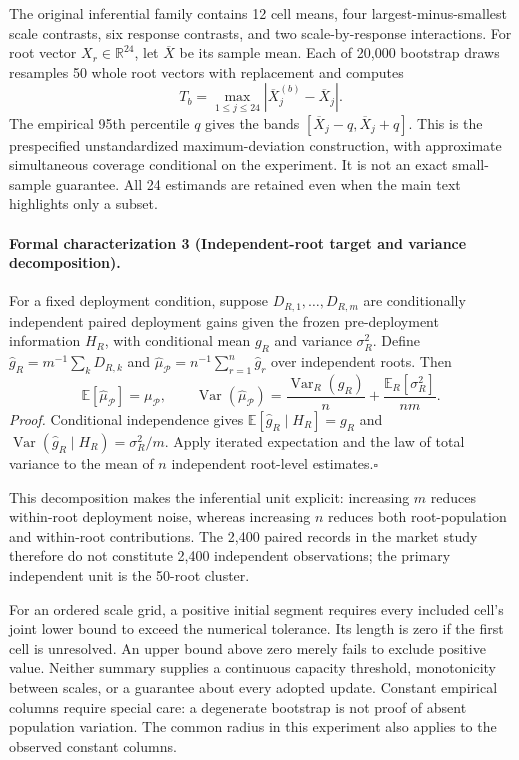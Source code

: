 \documentclass[10pt,letterpaper]{article}
\newcommand{\E}{\mathbb{E}}
\begin{document}
The original inferential family contains 12 cell means, four largest-minus-smallest scale contrasts, six response contrasts, and two scale-by-response interactions. For root vector $X_r\in\mathbb R^{24}$, let $\overline X$ be its sample mean. Each of 20,000 bootstrap draws resamples 50 whole root vectors with replacement and computes
\begin{equation}
T_b=\max_{1\leq j\leq24}|\overline X^{(b)}_j-\overline X_j|.
\end{equation}
The empirical 95th percentile $q$ gives the bands $[\overline X_j-q,\overline X_j+q]$. This is the prespecified unstandardized maximum-deviation construction, with approximate simultaneous coverage conditional on the experiment. It is not an exact small-sample guarantee. All 24 estimands are retained even when the main text highlights only a subset.

\paragraph{Formal characterization 3 (Independent-root target and variance decomposition).}
For a fixed deployment condition, suppose $D_{R,1},\ldots,D_{R,m}$ are conditionally independent paired deployment gains given the frozen pre-deployment information $H_R$, with conditional mean $g_R$ and variance $\sigma_R^2$. Define $\widehat g_R=m^{-1}\sum_kD_{R,k}$ and $\widehat\mu_{\mathcal P}=n^{-1}\sum_{r=1}^n\widehat g_r$ over independent roots. Then
\begin{equation}
\E[\widehat\mu_{\mathcal P}]=\mu_{\mathcal P}, \qquad
\operatorname{Var}(\widehat\mu_{\mathcal P})
=\frac{\operatorname{Var}_R(g_R)}{n}
 +\frac{\E_R[\sigma_R^2]}{nm}.
\label{eq:variance-decomposition}
\end{equation}
\emph{Proof.} Conditional independence gives $\E[\widehat g_R\mid H_R]=g_R$ and $\operatorname{Var}(\widehat g_R\mid H_R)=\sigma_R^2/m$. Apply iterated expectation and the law of total variance to the mean of $n$ independent root-level estimates.\hfill$\square$

This decomposition makes the inferential unit explicit: increasing $m$ reduces within-root deployment noise, whereas increasing $n$ reduces both root-population and within-root contributions. The 2,400 paired records in the market study therefore do not constitute 2,400 independent observations; the primary independent unit is the 50-root cluster.

For an ordered scale grid, a positive initial segment requires every included cell's joint lower bound to exceed the numerical tolerance. Its length is zero if the first cell is unresolved. An upper bound above zero merely fails to exclude positive value. Neither summary supplies a continuous capacity threshold, monotonicity between scales, or a guarantee about every adopted update. Constant empirical columns require special care: a degenerate bootstrap is not proof of absent population variation. The common radius in this experiment also applies to the observed constant columns.
\end{document}
